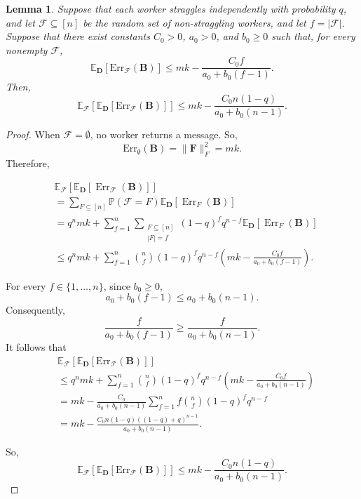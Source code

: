 \documentclass[journal,draftcls,onecolumn]{IEEEtran}
\theoremstyle{mystyle}
\newtheorem{lemma}{Lemma}
\newcommand{\cF}{\mathcal{F}}
\begin{document}
\begin{lemma}
\label{lemma:expected_error_random_straggling}
Suppose that each worker straggles independently with probability $q$, and let $\mathcal{F}\subseteq[n]$ be the random set of non-straggling workers, and let $f = |\mathcal{F}|$. Suppose that there exist constants $C_0>0$, $a_0>0$, and $b_0\geq 0$ such that, for every nonempty $\cF$,
\[
\mathbb{E}_{\mathbf{D}}
\left[
\text{Err}_{\mathcal{F}}(\mathbf{B})
\right]
\leq
mk-\frac{C_0f}{a_0+b_0(f-1)}.
\]
Then,
\[
\mathbb{E}_{\mathcal{F}}
\left[
\mathbb{E}_{\mathbf{D}}
\left[
\text{Err}_{\mathcal{F}}(\mathbf{B})
\right]
\right]
\leq
mk-
\frac{C_0n(1-q)}
{a_0+b_0(n-1)}.
\]
\end{lemma}

\begin{proof}

When $\mathcal{F}=\emptyset$, no worker returns a message. So,
\[
\text{Err}_{\emptyset}(\mathbf{B})
=
\|\mathbf{F}\|_F^2
=
mk.
\]
Therefore,

\begin{align*}
&\mathbb{E}_{\mathcal{F}}
\left[
\mathbb{E}_{\mathbf{D}}
\left[
\operatorname{Err}_{\mathcal{F}}(\mathbf{B})
\right]
\right]
\\
&=
\sum_{{F}\subseteq[n]} \mathbb{P}(\mathcal{F} = F)
\mathbb{E}_{\mathbf{D}}
\left[
\operatorname{Err}_{{F}}(\mathbf{B})
\right]
\\
&=
q^n mk
+
\sum_{f=1}^{n}
\sum_{\substack{{F}\subseteq[n]\\|{F}|=f}} (1-q)^f q^{n-f}
\mathbb{E}_{\mathbf{D}}
\left[
\operatorname{Err}_{{F}}(\mathbf{B})
\right]
\\
&\le
q^n mk
+
\sum_{f=1}^{n}
\binom{n}{f} (1-q)^f q^{n-f}
\left(
mk-\frac{C_0f}{a_0+b_0(f-1)}
\right)
.
\end{align*}




For every $f\in\{1,\ldots,n\}$, since $b_0\geq0$,
\[
a_0+b_0(f-1)
\leq
a_0+b_0(n-1).
\]
Consequently,
\[
\frac{f}{a_0+b_0(f-1)}
\geq
\frac{f}{a_0+b_0(n-1)}.
\]
It follows that
\[
\begin{aligned}
&\mathbb{E}_{\mathcal{F}}
\left[
\mathbb{E}_{\mathbf{D}}
\left[
\text{Err}_{\mathcal{F}}(\mathbf{B})
\right]
\right]
\\
&\leq
q^nmk
+
\sum_{f=1}^{n}
\binom{n}{f} (1-q)^f q^{n-f}
\left(
mk-\frac{C_0f}{a_0+b_0(n-1)}
\right)
\\
&=
mk-
\frac{C_0}{a_0+b_0(n-1)}
\sum_{f=1}^{n}f\binom{n}{f} (1-q)^f q^{n-f}
\\
&=
mk-
\frac{C_0n(1-q) ((1-q)+q)^{n-1}}
{a_0+b_0(n-1)}.
\end{aligned}
\]

So,
\[
\mathbb{E}_{\mathcal{F}}
\left[
\mathbb{E}_{\mathbf{D}}
\left[
\text{Err}_{\mathcal{F}}(\mathbf{B})
\right]
\right]
\leq
mk-
\frac{C_0n(1-q)}
{a_0+b_0(n-1)}.
\]
\end{proof}
\end{document}
